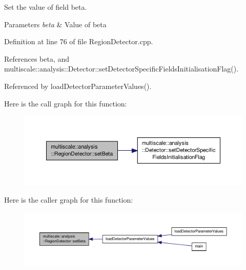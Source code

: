Set the value of field beta. 


\begin{DoxyParams}{Parameters}
{\em beta} & Value of beta \\
\hline
\end{DoxyParams}


Definition at line 76 of file Region\-Detector.\-cpp.



References beta, and multiscale\-::analysis\-::\-Detector\-::set\-Detector\-Specific\-Fields\-Initialisation\-Flag().



Referenced by load\-Detector\-Parameter\-Values().



Here is the call graph for this function\-:
\nopagebreak
\begin{figure}[H]
\begin{center}
\leavevmode
\includegraphics[width=350pt]{classmultiscale_1_1analysis_1_1RegionDetector_a054b6327918fd9a6ff2de293dac1afc0_cgraph}
\end{center}
\end{figure}




Here is the caller graph for this function\-:
\nopagebreak
\begin{figure}[H]
\begin{center}
\leavevmode
\includegraphics[width=350pt]{classmultiscale_1_1analysis_1_1RegionDetector_a054b6327918fd9a6ff2de293dac1afc0_icgraph}
\end{center}
\end{figure}


